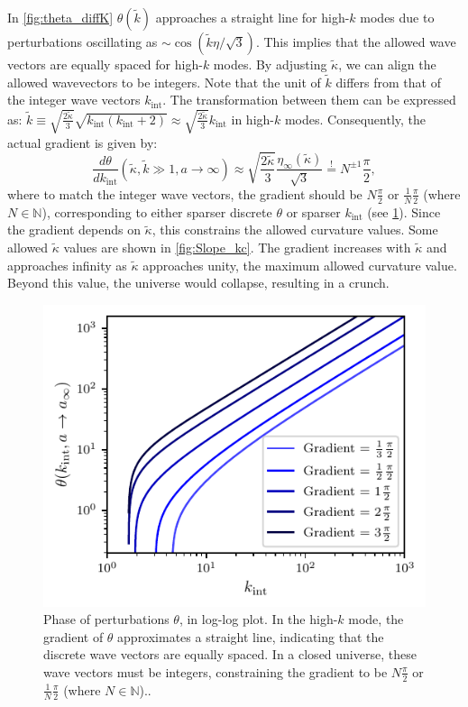 \documentclass[%
 reprint,
 amsmath,amssymb,
 prl,
]{revtex4-2}
\begin{document}
In \cref{fig:theta_diffK} \(\theta(\tilde{k})\) approaches a straight line for high-\(k\) modes due to perturbations oscillating as \(\sim \cos(\tilde{k}\eta/\sqrt{3})\).
This implies that the allowed wave vectors are equally spaced for high-\(k\) modes. By adjusting \(\tilde{\kappa}\), we can align the allowed wavevectors to be integers. Note that the unit of \(\tilde{k}\) differs from that of the integer wave vectors \(k_{\text{int}}\). The transformation between them can be expressed as: \(\tilde{k}\equiv  \sqrt{\frac{2\tilde{\kappa}}{3}} \sqrt{k_{\text{int}}(k_{\text{int}}+2) }  \approx \sqrt{\frac{2\tilde{\kappa}}{3}} k_{\text{int}}\) in high-\(k\) modes. Consequently, the actual gradient is given by:
\begin{equation}
\frac{d\theta}{dk_{\text{int}}}(\tilde{\kappa},\tilde{k}\gg 1,a\rightarrow \infty) \approx \sqrt{\frac{2\tilde{\kappa}}{3}}\frac{\eta_{\infty}(\tilde{\kappa})}{\sqrt{3}} \overset{!}{=} N^{\pm 1}\frac{\pi}{2},
\end{equation}
where to match the integer wave vectors, the gradient should be \(N\frac{\pi}{2}\) or \(\frac{1}{N}\frac{\pi}{2}\) (where \(N\in\mathbb{N}\)), corresponding to either sparser discrete \(\theta\) or sparser \(k_{\text{int}}\) (see \cref{fig:theta_kint}). Since the gradient depends on \(\tilde{\kappa}\), this constrains the allowed curvature values. Some allowed \(\tilde{\kappa}\) values are shown in \cref{fig:Slope_kc}. The gradient increases with \(\tilde{\kappa}\) and approaches infinity as \(\tilde{\kappa}\) approaches unity, the maximum allowed curvature value. Beyond this value, the universe would collapse, resulting in a crunch.

\begin{figure}
     \includegraphics{theta-kint_loglog.pdf}
     \caption{Phase of perturbations $\theta$, in log-log plot. In the high-\(k\) mode, the gradient of \(\theta\) approximates a straight line, indicating that the discrete wave vectors are equally spaced. In a closed universe, these wave vectors must be integers, constraining the gradient to be \(N\frac{\pi}{2}\) or \(\frac{1}{N}\frac{\pi}{2}\) (where \(N\in\mathbb{N}\))..
     }
     \label{fig:theta_kint}
\end{figure} 
\end{document}
